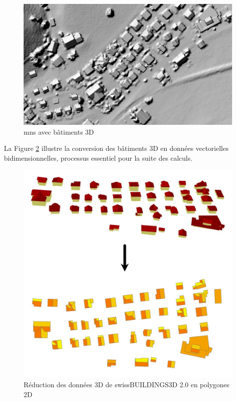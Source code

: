 \begin{figure}[H]
    \centering
    \includegraphics[width=1\linewidth]{02-main//figures/ch2/ch2_montoitsolaire_02_mns_3d.png}
    \caption{\acrshort{mns} avec bâtiments 3D \cite{bfe_wie_nodate}}
    \label{fig:ch2_montoitsolaire_02_mns_3d}
\end{figure}

La Figure \ref{fig:ch2_montoitsolaire_03_3d_vectoriel1} illustre la conversion des bâtiments 3D en données vectorielles bidimensionnelles, processus essentiel pour la suite des calculs.

\begin{figure}[H]
    \centering
    \includegraphics[width=1\linewidth]{02-main//figures/ch2/ch2_montoitsolaire_03_3d_vectoriel1.png}
    \caption{Réduction des données 3D de swissBUILDINGS3D 2.0 en polygones 2D \cite{bfe_wie_nodate}}
    \label{fig:ch2_montoitsolaire_03_3d_vectoriel1}
\end{figure}

